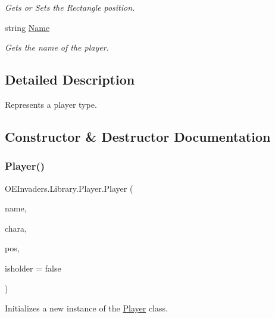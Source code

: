 \begin{DoxyCompactItemize}
\begin{DoxyCompactList}\small\item\em Gets or Sets the Rectangle position. \end{DoxyCompactList}\item 
string \mbox{\hyperlink{class_o_e_invaders_1_1_library_1_1_player_ae0581379a87561b9acd51df3ca815651}{Name}}
\begin{DoxyCompactList}\small\item\em Gets the name of the player. \end{DoxyCompactList}\end{DoxyCompactItemize}


\subsection{Detailed Description}
Represents a player type. 



\subsection{Constructor \& Destructor Documentation}
\mbox{\label{class_o_e_invaders_1_1_library_1_1_player_abf828a4deec8282e11c19a9e73b1877d}} 
\subsubsection{\texorpdfstring{Player()}{Player()}}
{\footnotesize\ttfamily O\+E\+Invaders.\+Library.\+Player.\+Player (\begin{DoxyParamCaption}\item[{string}]{name,  }\item[{\mbox{\hyperlink{namespace_o_e_invaders_1_1_library_ad161194088b9101570c071d1baa1d2c7}{Player\+Character}}}]{chara,  }\item[{Point}]{pos,  }\item[{bool}]{isholder = {\ttfamily false} }\end{DoxyParamCaption})}



Initializes a new instance of the \mbox{\hyperlink{class_o_e_invaders_1_1_library_1_1_player}{Player}} class. 


